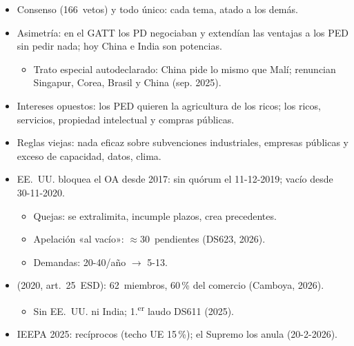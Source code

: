 \documentclass{article}
\begin{document}
\begin{columnas}
\begin{itemize}
\item Consenso (166~vetos) y todo único: cada tema, atado a los demás.
\item Asimetría: en el GATT los PD negociaban y extendían las ventajas a los PED sin pedir nada; hoy China e India son potencias.
  \begin{itemize}
  \item Trato especial autodeclarado: China pide lo mismo que Malí; renuncian Singapur, Corea, Brasil y China (sep. 2025).
  \end{itemize}
\item Intereses opuestos: los PED quieren la agricultura de los ricos; los ricos, servicios, propiedad intelectual y compras públicas.
\item Reglas viejas: nada eficaz sobre subvenciones industriales, empresas públicas y exceso de capacidad, datos, clima.
\end{itemize}
\begin{itemize}
\item EE.~UU. bloquea el OA desde 2017: sin quórum el 11-12-2019; vacío desde 30-11-2020.
  \begin{itemize}
  \item Quejas: se extralimita, incumple plazos, crea precedentes.
  \end{itemize}
  \begin{itemize}
  \item Apelación «al vacío»: $\approx$30~pendientes (DS623, 2026).
  \item Demandas: 20-40/año $\to$ 5-13.
  \end{itemize}
\item {} (2020, art.~25~ESD): 62~miembros, 60\,\% del comercio (Camboya, 2026).
  \begin{itemize}
  \item Sin EE.~UU. ni India; 1.\textsuperscript{er} laudo DS611 (2025).
  \end{itemize}
\end{itemize}
\begin{itemize}
\item IEEPA 2025: recíprocos (techo UE 15\,\%); el Supremo los anula (20-2-2026).

\end{itemize}
\end{columnas}
\end{document}
